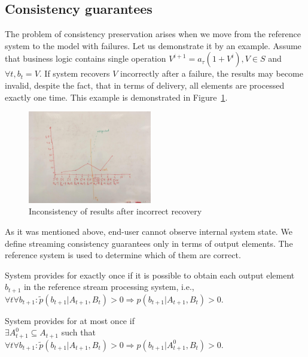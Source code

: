 \subsection{Consistency guarantees}

The problem of consistency preservation arises when we move from the reference system to the model with failures. Let us demonstrate it by an example. Assume that business logic contains single operation $V^{i+1}=a_\tau(1+V^{i}),V\in{S}$ and $\forall{t},b_t=V$. If system recovers $V$ incorrectly after a failure, the results may become invalid, despite the fact, that in terms of delivery, all elements are processed exactly one time. This example is demonstrated in Figure~\ref{state-inconsistency}. 

\begin{figure}[htbp]
  \centering
  \includegraphics[width=0.48\textwidth]{pics/state-inconsistency}
  \caption{Inconsistency of results after incorrect recovery}
  \label {state-inconsistency}
\end{figure}

As it was mentioned above, end-user cannot observe internal system state. We define streaming consistency guarantees only in terms of output elements. The reference system is used to determine which of them are correct.

\begin{definition}{System provides for exactly once}
if it is possible to obtain each output element $b_{t+1}$ in the reference stream processing system, i.e.,\\ 
$\forall{t} \forall{b_{t+1}}: \widetilde{p}(b_{t+1}|A_{t+1},B_t)>0 \Rightarrow p(b_{t+1}|A_{t+1},B_t)>0$.
\end{definition}

\begin{definition}{System provides for at most once}
if \\
$\exists{A^{0}_{t+1}\subseteq{A_{t+1}}}$ such that \\
$\forall{t} \forall{b_{t+1}}: \widetilde{p}(b_{t+1}|A_{t+1},B_t)>0 \Rightarrow p(b_{t+1}|A^{0}_{t+1},B_t)>0$.
\end{definition}

